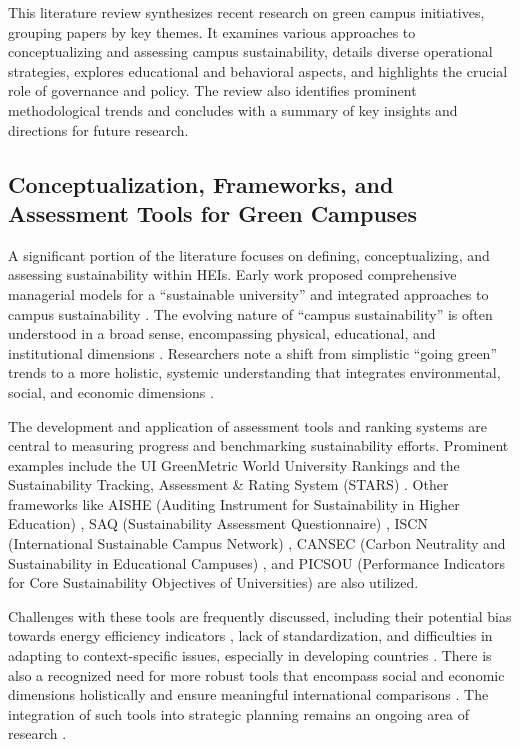 \documentclass[12pt,a4paper]{article}
\begin{document}
This literature review synthesizes recent research on green campus initiatives, grouping papers by key themes. It examines various approaches to conceptualizing and assessing campus sustainability, details diverse operational strategies, explores educational and behavioral aspects, and highlights the crucial role of governance and policy. The review also identifies prominent methodological trends and concludes with a summary of key insights and directions for future research.

\subsection{Conceptualization, Frameworks, and Assessment Tools for Green Campuses}

A significant portion of the literature focuses on defining, conceptualizing, and assessing sustainability within HEIs. Early work proposed comprehensive managerial models for a ``sustainable university'' \citep{Velazquez2006} and integrated approaches to campus sustainability \citep{Alshuwaikhat2008}. The evolving nature of ``campus sustainability'' is often understood in a broad sense, encompassing physical, educational, and institutional dimensions \citep{Disterheft2013}. Researchers note a shift from simplistic ``going green'' trends to a more holistic, systemic understanding that integrates environmental, social, and economic dimensions \citep{Alshuwaikhat2016, Sugiarto2022, Popowska2024}.

The development and application of assessment tools and ranking systems are central to measuring progress and benchmarking sustainability efforts. Prominent examples include the UI GreenMetric World University Rankings \citep{Suwartha2013, MunozSuarez2020, Alawneh2021, Safarkhani2022, Fatah2025} and the Sustainability Tracking, Assessment \& Rating System (STARS) \citep{Urbanski2015, Kirrane2020, Zhu2021, WashingtonOttombre2024}. Other frameworks like AISHE (Auditing Instrument for Sustainability in Higher Education) \citep{Lambrechts2013, Lambrechts2015}, SAQ (Sustainability Assessment Questionnaire) \citep{Alshuwaikhat2016}, ISCN (International Sustainable Campus Network) \citep{Sonetti2016}, CANSEC (Carbon Neutrality and Sustainability in Educational Campuses) \citep{Jain2017}, and PICSOU (Performance Indicators for Core Sustainability Objectives of Universities) \citep{Jiang2023} are also utilized.

Challenges with these tools are frequently discussed, including their potential bias towards energy efficiency indicators \citep{Sonetti2016}, lack of standardization, and difficulties in adapting to context-specific issues, especially in developing countries \citep{Velasco2018, Zhu2021, Dawodu2024}. There is also a recognized need for more robust tools that encompass social and economic dimensions holistically \citep{Sonetti2016, Zhang2025} and ensure meaningful international comparisons \citep{Horan2021}. The integration of such tools into strategic planning remains an ongoing area of research \citep{Chen2019, Horan2021, Alalawi2024}.
\end{document}
